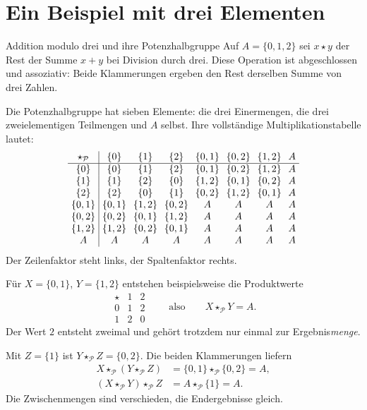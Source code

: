 \clearpage
\section*{Ein Beispiel mit drei Elementen}

\begin{PowerReadingExample}{Addition modulo drei und ihre Potenzhalbgruppe}
Auf \(A=\{0,1,2\}\) sei \(x\star y\) der Rest der Summe
\(x+y\) bei Division durch drei. Diese Operation ist abgeschlossen
und assoziativ: Beide Klammerungen ergeben den Rest derselben Summe
von drei Zahlen.

Die Potenzhalbgruppe hat sieben Elemente: die drei Einermengen, die
drei zweielementigen Teilmengen und \(A\) selbst. Ihre vollständige
Multiplikationstabelle lautet:
\[
 {\setlength{\arraycolsep}{3.5pt}
 \begin{array}{c|ccccccc}
 \star_{\mathcal P}&\{0\}&\{1\}&\{2\}&\{0,1\}&\{0,2\}&\{1,2\}&A\\\hline
 \{0\}&\{0\}&\{1\}&\{2\}&\{0,1\}&\{0,2\}&\{1,2\}&A\\
 \{1\}&\{1\}&\{2\}&\{0\}&\{1,2\}&\{0,1\}&\{0,2\}&A\\
 \{2\}&\{2\}&\{0\}&\{1\}&\{0,2\}&\{1,2\}&\{0,1\}&A\\
 \{0,1\}&\{0,1\}&\{1,2\}&\{0,2\}&A&A&A&A\\
 \{0,2\}&\{0,2\}&\{0,1\}&\{1,2\}&A&A&A&A\\
 \{1,2\}&\{1,2\}&\{0,2\}&\{0,1\}&A&A&A&A\\
 A&A&A&A&A&A&A&A
 \end{array}}
\]
Der Zeilenfaktor steht links, der Spaltenfaktor rechts.

Für \(X=\{0,1\}\), \(Y=\{1,2\}\) entstehen beispielsweise
die Produktwerte
\[
 \begin{array}{c|cc}
 \star&1&2\\\hline
 0&1&2\\
 1&2&0
 \end{array}
 \qquad\text{also}\qquad X\star_{\mathcal P}Y=A.
\]
Der Wert \(2\) entsteht zweimal und gehört trotzdem nur einmal
zur Ergebnis\emph{menge}.

Mit \(Z=\{1\}\) ist \(Y\star_{\mathcal P}Z=\{0,2\}\).
Die beiden Klammerungen liefern
\[
 \begin{aligned}
 X\star_{\mathcal P}(Y\star_{\mathcal P}Z)
   &=\{0,1\}\star_{\mathcal P}\{0,2\}=A,\\
 (X\star_{\mathcal P}Y)\star_{\mathcal P}Z
   &=A\star_{\mathcal P}\{1\}=A.
 \end{aligned}
\]
Die Zwischenmengen sind verschieden, die Endergebnisse gleich.
\end{PowerReadingExample}

